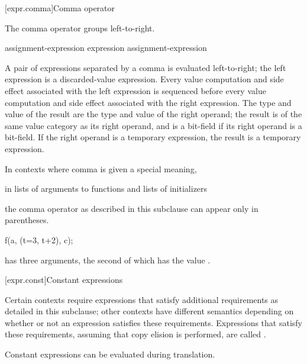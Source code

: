 [expr.comma]{Comma operator}%
%
%
%
%
%

\pnum
The comma operator groups left-to-right.

\begin{bnf}
\br
    assignment-expression\br
    expression \terminal{,} assignment-expression
\end{bnf}

A pair of expressions separated by a comma is evaluated left-to-right;
the left expression is
a discarded-value expression.
Every
%
value computation and side effect
associated with the left expression is sequenced before every value
computation and side effect associated with the right expression.
%
The type and value of the
result are the type and value of the right operand; the result is of the same
value category as its right operand, and is a bit-field if its
right operand is a bit-field.
If the right operand is a temporary expression,
the result is a temporary expression.

\pnum
In contexts where comma is given a special meaning, \begin{example} in
lists of arguments to functions and lists of
initializers \end{example} the comma operator as
described in this subclause can appear only in parentheses.
\begin{example}

\begin{codeblock}
f(a, (t=3, t+2), c);
\end{codeblock}

has three arguments, the second of which has the value
.
\end{example}

[expr.const]{Constant expressions}%

\pnum
Certain contexts require expressions that satisfy additional
requirements as detailed in this subclause; other contexts have different
semantics depending on whether or not an expression satisfies these requirements.
Expressions that satisfy these requirements,
assuming that copy elision is performed,
are called
%
. \begin{note} Constant expressions can be evaluated
during translation.\end{note}

